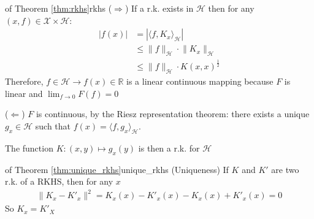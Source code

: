 \documentclass{article}
\begin{document}
\begin{Proof}{of Theorem \ref{thm:rkhs}}{rkhs}
  ($\Rightarrow$) If a r.k. exists in $\mathcal{H}$ then for any $(x,f) \in 
  \mathcal{X} \times \mathcal{H}$:
  \begin{align*}
    |f(x)| &= |\langle f, K_x \rangle_\mathcal{H} |\\
           &\leq \lVert f \rVert_\mathcal{H} \cdot \lVert K_x \rVert_\mathcal{H}
           \tag{Cauchy-Schwarz}\\
           &\leq \lVert f \rVert_\mathcal{H} \cdot K(x,x)^\frac{1}{2}
  \end{align*}
  Therefore, $f\in\mathcal{H} \rightarrow f(x) \in \mathbb{R}$ is a linear 
  continuous mapping because $F$ is linear and $\lim_{f\rightarrow 0} F(f)= 0$

  \vspace{10pt}
  ($\Leftarrow$) $F$ is continuous, by the Riesz representation theorem: there
  exists a unique $g_x \in \mathcal{H}$ such that $f(x) = \langle f, g_x 
  \rangle_\mathcal{H}$.

  The function $K: (x, y) \mapsto g_x(y)$ is then a r.k. for $\mathcal{H}$
\end{Proof}

\begin{Proof}{of Theorem \ref{thm:unique_rkhs}}{unique_rkhs}
  (Uniqueness) If $K$ and $K'$ are two r.k. of a RKHS, then for any $x$
  \begin{align*}
    \lVert K_x - K'_x\rVert^2 = K_x(x) - K'_x(x) - K_x(x) + K'_x(x) = 0
  \end{align*}
  So $K_x = K'_X$

\end{Proof}
\end{document}
